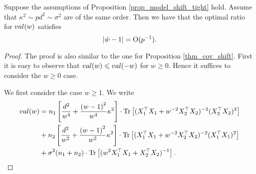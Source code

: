 \begin{lemma}\label{lem_hat_v}
Suppose the assumptions of Proposition \ref{prop_model_shift_tight} hold. Assume that $ \kappa^2 \sim pd^2 \sim \sigma^2$ are of the same order. Then we have that the optimal ratio for $val(w)$ satisfies
	$$|\hat w -1|=\operatorname{O}(p^{-1}).$$%
\end{lemma}
\begin{proof}
The proof is also similar to the one for Proposition \ref{thm_cov_shift}. First it is easy to observe that $val(w)\leqslant val(-w)$ for $w\ge 0$. Hence it suffices to consider the $w\ge 0$ case.

We first consider the case $w\ge 1$. We write
\begin{align}
	\val(w) &= n_1\left[\frac{d^2}{w^4} +\frac{\left( w-1\right)^2}{w^4}\kappa^2\right]\cdot \tr\left[( X_1^{\top}X_1 +w^{-2}X_2^{\top}X_2)^{-2} (X_2^{\top}X_2)^2\right] \nonumber \\
	& + n_2\left[\frac{d^2}{w^2} +\frac{\left( w-1\right)^2}{w^2}\kappa^2\right]\cdot \tr\left[( X_1^{\top}X_1 +w^{-2}X_2^{\top}X_2)^{-2} (X_1^{\top}X_1)^2\right] \nonumber\\
			& + \sigma^2(n_1+n_2) \cdot \bigtr{(w^{2}X_1^{\top}X_1  + X_2^{\top}X_2)^{-1} } .\nonumber%
\end{align}


\end{proof}
